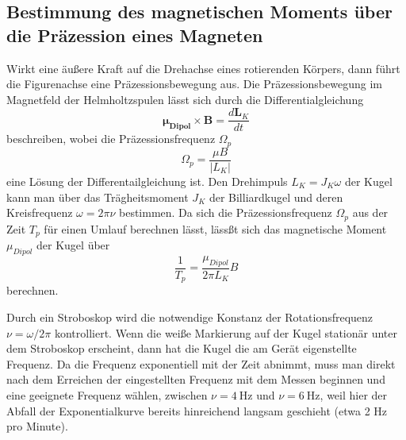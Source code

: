 \subsection{Bestimmung des magnetischen Moments über die Präzession eines Magneten}
\label{sec:Präzession}
Wirkt eine äußere Kraft auf die Drehachse eines rotierenden Körpers, dann führt die Figurenachse eine Präzessionsbewegung aus.
Die Präzessionsbewegung im Magnetfeld der Helmholtzspulen lässt sich durch die Differentialgleichung
\begin{equation}
    \symbf{\mu_{Dipol}} \times \symbf{B} = \frac{d\symbf{L}_K}{dt}
\end{equation}
beschreiben, wobei die Präzessionsfrequenz $\Omega_p$
\begin{equation}
    \Omega_p = \frac{\mu B}{|L_K|}
\end{equation}
eine Lösung der Differentailgleichung ist.
Den Drehimpuls $L_K = J_K \omega$ der Kugel kann man über das Trägheitsmoment $J_K$ der Billiardkugel und deren Kreisfrequenz $\omega = 2\pi \nu$ bestimmen.
Da sich die Präzessionsfrequenz $\Omega_p$ aus der Zeit $T_p$ für einen Umlauf berechnen lässt, lässßt sich das magnetische Moment $\mu_{Dipol}$ der Kugel über
\begin{equation}
    \frac{1}{T_p} = \frac{\mu_{Dipol}}{2 \pi L_K} B
\end{equation}
berechnen.

Durch ein Stroboskop wird die notwendige Konstanz der Rotationsfrequenz $\nu = \omega / 2 \pi$ kontrolliert.
Wenn die weiße Markierung auf der Kugel stationär unter dem Stroboskop erscheint, dann hat die Kugel die am Gerät eigenstellte Frequenz.
Da die Frequenz exponentiell mit der Zeit abnimmt, muss man direkt nach dem Erreichen der eingestellten Frequenz mit dem Messen beginnen und 
eine geeignete Frequenz wählen, zwischen $\nu = \SI{4}{\Hz}$ und $\nu = \SI{6}{\Hz}$, weil hier der Abfall der Exponentialkurve bereits hinreichend langsam geschieht (etwa 2 Hz pro Minute).

